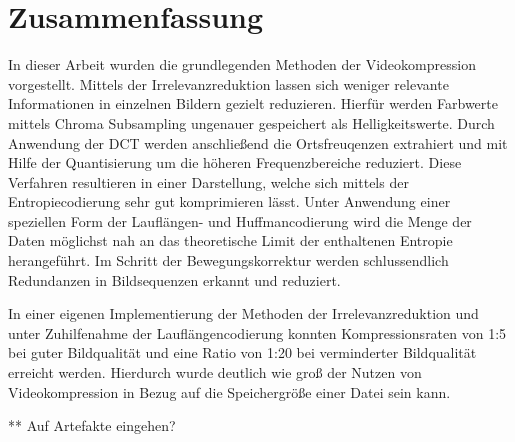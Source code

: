 \chapter{Zusammenfassung}
\label{kap:Zusammenfassung}

In dieser Arbeit wurden die grundlegenden Methoden der Videokompression vorgestellt. Mittels der Irrelevanzreduktion lassen sich weniger relevante Informationen in einzelnen Bildern gezielt reduzieren. Hierfür werden Farbwerte mittels Chroma Subsampling ungenauer gespeichert als Helligkeitswerte. Durch Anwendung der DCT werden anschließend die Ortsfreuqenzen extrahiert und mit Hilfe der Quantisierung um die höheren Frequenzbereiche reduziert. Diese Verfahren resultieren in einer Darstellung, welche sich mittels der Entropiecodierung sehr gut komprimieren lässt. Unter Anwendung einer speziellen Form der Lauflängen- und Huffmancodierung wird die Menge der Daten möglichst nah an das theoretische Limit der enthaltenen Entropie herangeführt. Im Schritt der Bewegungskorrektur werden schlussendlich Redundanzen in Bildsequenzen erkannt und reduziert.

In einer eigenen Implementierung der Methoden der Irrelevanzreduktion und unter Zuhilfenahme der Lauflängencodierung konnten Kompressionsraten von 1:5 bei guter Bildqualität und eine Ratio von 1:20 bei verminderter Bildqualität erreicht werden. Hierdurch wurde deutlich wie groß der Nutzen von Videokompression in Bezug auf die Speichergröße einer Datei sein kann.

** Auf Artefakte eingehen?
